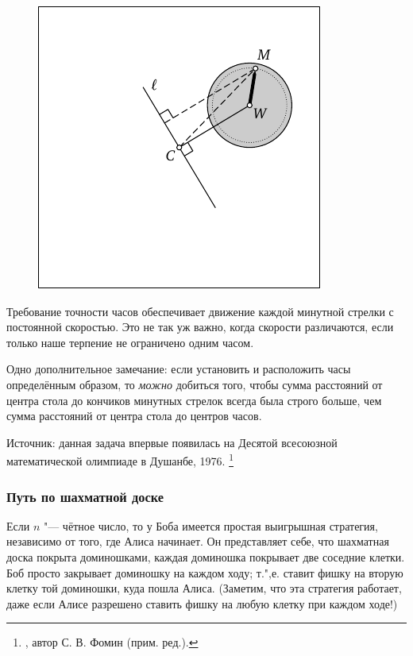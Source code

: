 \documentclass[twoside]{book}
\begin{document}
\begin{figure}[!ht]
\centering
\includegraphics{mp/wink-3}
\end{figure}

Требование точности часов обеспечивает движение каждой минутной стрелки с постоянной скоростью.
Это не так уж важно, когда скорости различаются, если только наше терпение не ограничено одним часом.

Одно дополнительное замечание: если установить и расположить часы определённым образом,
то \emph{можно} добиться того, чтобы сумма расстояний от центра стола до кончиков минутных стрелок всегда была строго больше, чем сумма расстояний от центра стола до центров часов.

\medskip

{\small
Источник: данная задача впервые появилась на Десятой всесоюзной математической олимпиаде в Душанбе, 1976. \footnote{\cite[№220]{ВсМО}, автор С. В. Фомин (прим. ред.).}

}
\subsubsection*{Путь по шахматной доске} %

Если $n$ "--- чётное число, то у Боба имеется простая выигрышная стратегия, независимо от того, где Алиса начинает.
Он представляет себе, что шахматная доска  покрыта доминошками, каждая доминошка покрывает две соседние клетки.
Боб просто закрывает доминошку на каждом ходу; т.",е. ставит фишку на вторую клетку той доминошки, куда пошла Алиса. 
(Заметим, что эта стратегия работает, даже если Алисе разрешено ставить фишку на любую клетку при каждом ходе!)
\end{document}
